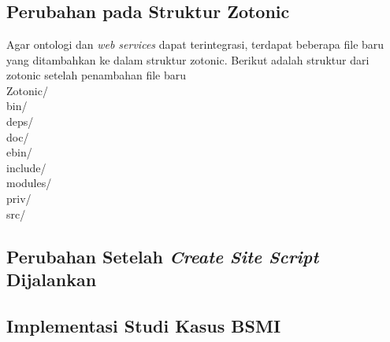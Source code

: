\chapter{\babLima}

\section{Perubahan pada Struktur Zotonic}

Agar ontologi dan \textit{web services} dapat terintegrasi, terdapat beberapa file baru yang ditambahkan ke dalam struktur zotonic. Berikut adalah struktur dari zotonic setelah penambahan file baru\\
	Zotonic/ \\
		bin/ \\
		deps/ \\
		doc/ \\
		ebin/ \\
		include/ \\
		modules/ \\
		priv/ \\
		src/ \\
		
\section{Perubahan Setelah \textit{Create Site Script} Dijalankan} %

\section{Implementasi Studi Kasus BSMI}
